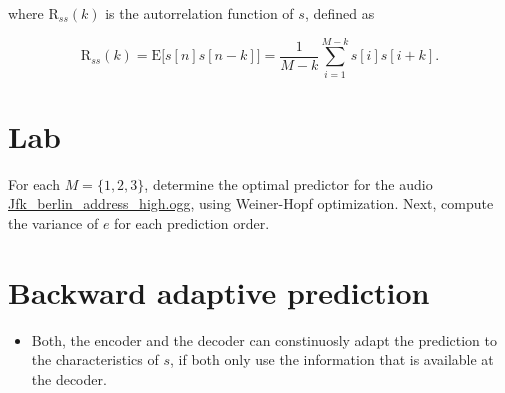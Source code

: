 \begin{itemize}
  where \(\text{R}_{ss}(k)\) is the autorrelation function of \(s\),
  defined as

  \begin{equation}
    \text{R}_{ss}(k) = \text{E}\big[s[n]s[n-k]\big] = \frac{1}{M-k}\sum_{i=1}^{M-k} s[i]s[i+k].
    \tag{autocorrelation}
    \label{autocorrelation}
  \end{equation}
\end{itemize}

\section{Lab}
For each \(M=\{1,2,3\}\), determine the optimal predictor for the audio
\href{https://upload.wikimedia.org/wikipedia/commons/3/3a/Jfk_berlin_address_high.ogg}{Jfk\_berlin\_address\_high.ogg},
using Weiner-Hopf optimization. Next, compute the variance of \(e\) for
each prediction order.

\section{Backward adaptive prediction}
\begin{itemize}
\tightlist
\item
  Both, the encoder and the decoder can constinuosly adapt the
  prediction to the characteristics of \(s\), if both only use the
  information that is available at the decoder.
\end{itemize}

